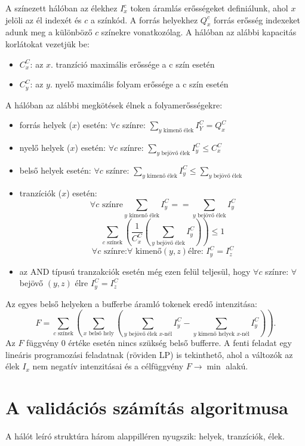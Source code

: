 A színezett hálóban az élekhez $I^c_x$ token áramlás erősségeket definiálunk, ahol $x$ jelöli az él indexét és $c$ a színkód. A forrás helyekhez $Q^c_x$ forrás erősség indexeket adunk meg a különböző $c$ színekre vonatkozólag. A hálóban az alábbi kapacitás korlátokat vezetjük be:
\begin{itemize}
\item $C^C_x$: az $x$. tranzíció maximális erőssége a c szín esetén 
\item $C^C_y$: az $y$. nyelő maximális folyam erőssége a c szín esetén
\end{itemize}
A hálóban az alábbi megkötések élnek a folyamerősségekre:
\begin{itemize}
\item forrás helyek ($x$) esetén: $\forall c$ színre: $\sum_{y\text{ kimenő élek}}I^C_Y = Q^C_x$
\item nyelő helyek ($x$) esetén: $\forall c$ színre: $\sum_{y\text{ bejövő élek}}I^C_y \leq C^C_x$
\item belső helyek esetén: $\forall c$ színre: $\sum_{y\text{ kimenő élek}} I^C_y \leq \sum_{y\text{ bejövő élek}}$
\item tranzíciók ($x$) esetén:
$$\forall c \text{ színre} \sum_{y\text{ kimenő élek}} I^C_y == \sum_{y\text{ bejövő élek}} I^C_y $$
$$\sum_{c \text{ színek}}\left( \frac{1}{C^C_x} \left( \sum_{y \text{ bejövő élek}} I^C_y \right) \right) \leq 1$$
$$\forall c \text{ színre:} \forall \text{ kimenő} (y,z) \text{élre: } I^C_y=I^C_z$$
\item az AND típusú tranzakciók esetén még ezen felül teljesül, hogy 	$\forall c$ színre: $\forall$ bejövő $(y,z)$ élre $I^C_y=I^C_z$
\end{itemize}
Az egyes belső helyeken a bufferbe áramló tokenek  eredő intenzitása:
$$F=\sum_{c\text{ színek}} \left( \sum_{x\text{ belső hely}}\left( \sum_{y\text{ bejövő élek }x\text{-nél}}I^C_y - \sum_{y \text{ kimenő helyek }x\text{-nél}} I^C_y \right) \right).$$
Az $F$ függvény 0 értéke esetén nincs szükség belső bufferre. 
A fenti feladat egy lineáris programozási feladatnak (röviden LP) is tekinthető, ahol a változók az élek $I_x$ nem negatív intenzitásai és a célfüggvény $F \rightarrow \min$ alakú. 

\section{A validációs számítás algoritmusa}

A hálót leíró struktúra három alappilléren nyugszik: helyek, tranzíciók, élek.


